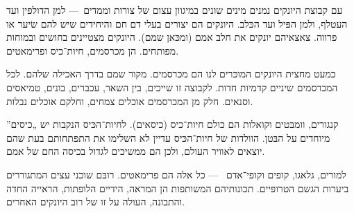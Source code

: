 
עם קבוצת היונקים נמנים מינים שונים במיגוון עצום של צורות וממדים~— למן הדולפין ועד העטלף, ולמן הפּיל ועד הכּלב. היונקים הם יצורים בעלי דם חם והיחידים שיש להם שׂיער או פרווה. צאצאיהם יונקים את חלב אמם (ומכּאן שמם). היונקים מצטיינים בחושים ובמוחות מפותחים.  הן מכרסמים, חיות־כיס ופרימאטים.



כמעט מחצית היונקים המוכּרים לנו הם מכרסמים. מקור שמם בדרך האכילה שלהם. לכל המכרסמים שיניים קדמיות חדות. לקבוצה זו שייכים, בין השאר, עכברים, בונים, טמיאסים וסנאים. חלק מן המכרסמים אוכלים צמחים, וחלקם אוכלים נבלות.



קנגורים, וומבּטים וקואלות הם כולם חיות־כיס (כיסאים). לחיות־הכּיס הנקבות יש „כיסים” מיוחדים על הבּטן. הוולדות של חיות־הכּיס עדיין לא השלימו את התפּתחותם בעת שהם יוצאים לאוויר העולם, ולכן הם ממשיכים לגדול בכיסה החם של אמם.



למורים, גלאגו, קופים וקופי־אדם ~— כל אלה הם פרימאטים. רובּם שוכני עצים המתגוררים ביערות הגשם הטרופּיים. תכונותיהם המשותפות הן המראה, הידיים הלופתות, הראייה החדה והתבונה, העולה על זו של רוב היונקים האחרים.
